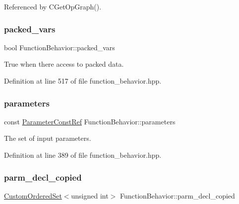 Referenced by C\+Get\+Op\+Graph().

\mbox{\label{classFunctionBehavior_a83aed93537871a44f2bc14938290e5c6}} 
\subsubsection{\texorpdfstring{packed\+\_\+vars}{packed\_vars}}
{\footnotesize\ttfamily bool Function\+Behavior\+::packed\+\_\+vars}



True when there access to packed data. 



Definition at line 517 of file function\+\_\+behavior.\+hpp.

\mbox{\label{classFunctionBehavior_a8a568943fd66b40da9b58df7d3fc4da0}} 
\subsubsection{\texorpdfstring{parameters}{parameters}}
{\footnotesize\ttfamily const \hyperlink{Parameter_8hpp_a37841774a6fcb479b597fdf8955eb4ea}{Parameter\+Const\+Ref} Function\+Behavior\+::parameters\hspace{0.3cm}{\ttfamily [private]}}



The set of input parameters. 



Definition at line 389 of file function\+\_\+behavior.\+hpp.

\mbox{\label{classFunctionBehavior_aade3216da8c9cd5bb3a624ebe3ad15d6}} 
\subsubsection{\texorpdfstring{parm\+\_\+decl\+\_\+copied}{parm\_decl\_copied}}
{\footnotesize\ttfamily \hyperlink{classCustomOrderedSet}{Custom\+Ordered\+Set}$<$unsigned int$>$ Function\+Behavior\+::parm\+\_\+decl\+\_\+copied\hspace{0.3cm}{\ttfamily [private]}}



